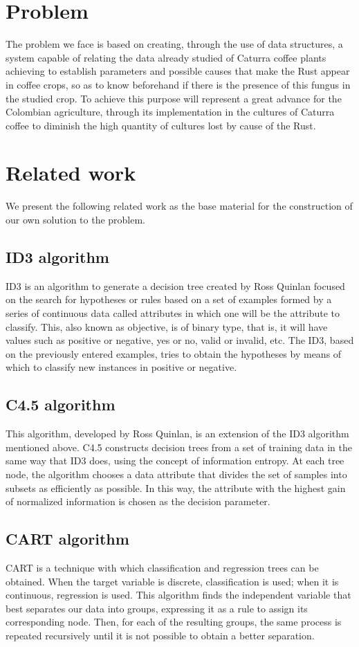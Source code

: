 \documentclass{acm_proc_article-sp}
\begin{document}
\section{Problem}
The problem we face is based on creating, through the use of data structures, a system capable of relating the data already studied of Caturra coffee plants achieving to establish parameters and possible causes that make the Rust appear in coffee crops, so as to know beforehand if there is the presence of this fungus in the studied crop.
To achieve this purpose will represent a great advance for the Colombian agriculture, through its implementation in the cultures of Caturra coffee to diminish the high quantity of cultures lost by cause of the Rust.

\section{Related work}
We present the following related work as the base material for the construction of our own solution to the problem.
\subsection{ID3 algorithm}
ID3 is an algorithm to generate a decision tree created by Ross Quinlan focused on the search for hypotheses or rules based on a set of examples formed by a series of continuous data called attributes in which one will be the attribute to classify. This, also known as objective, is of binary type, that is, it will have values such as positive or negative, yes or no, valid or invalid, etc.
The ID3, based on the previously entered examples, tries to obtain the hypotheses by means of which to classify new instances in positive or negative.

\subsection{C4.5 algorithm}
This algorithm, developed by Ross Quinlan, is an extension of the ID3 algorithm mentioned above. C4.5 constructs decision trees from a set of training data in the same way that ID3 does, using the concept of information entropy. At each tree node, the algorithm chooses a data attribute that divides the set of samples into subsets as efficiently as possible. In this way, the attribute with the highest gain of normalized information is chosen as the decision parameter.

\subsection{CART algorithm}
CART is a technique with which classification and regression trees can be obtained. When the target variable is discrete, classification is used; when it is continuous, regression is used. This algorithm finds the independent variable that best separates our data into groups, expressing it as a rule to assign its corresponding node. Then, for each of the resulting groups, the same process is repeated recursively until it is not possible to obtain a better separation.
\end{document}

